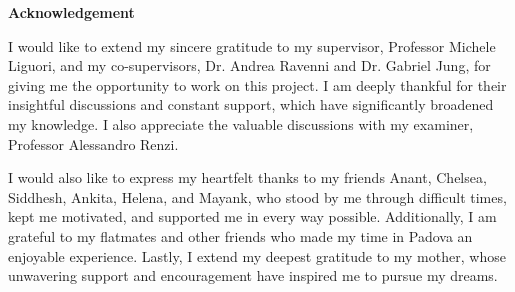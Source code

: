 \newpage
\begin{center}
    \huge \textbf{Acknowledgement}
\end{center}

\vspace{0.5in}

I would like to extend my sincere gratitude to my supervisor, Professor Michele Liguori, and my co-supervisors, Dr. Andrea Ravenni and Dr. Gabriel Jung, for giving me the opportunity to work on this project. I am deeply thankful for their insightful discussions and constant support, which have significantly broadened my knowledge. I also appreciate the valuable discussions with my examiner, Professor Alessandro Renzi.


I would also like to express my heartfelt thanks to my friends Anant, Chelsea, Siddhesh, Ankita, Helena, and Mayank, who stood by me through difficult times, kept me motivated, and supported me in every way possible. Additionally, I am grateful to my flatmates and other friends who made my time in Padova an enjoyable experience. Lastly, I extend my deepest gratitude to my mother, whose unwavering support and encouragement have inspired me to pursue my dreams.
